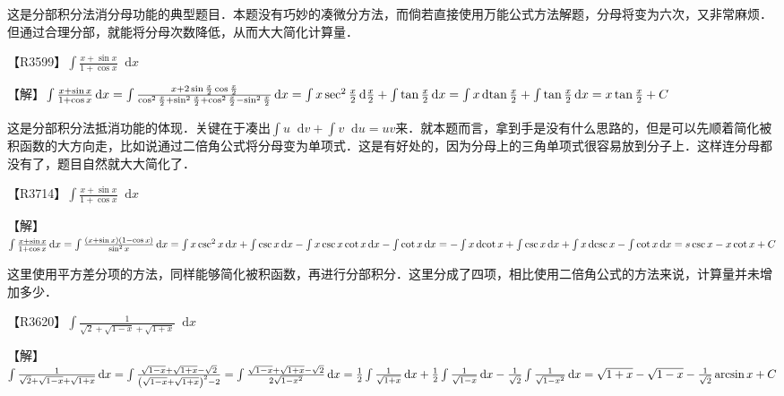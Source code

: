 \documentclass{ctexbook}
\newcommand*{\dif}{\mathop{}\!\mathrm{d}}
\begin{document}
{\kaishu 这是分部积分法消分母功能的典型题目．本题没有巧妙的凑微分方法，而倘若直接使用万能公式方法解题，分母将变为六次，又非常麻烦．但通过合理分部，就能将分母次数降低，从而大大简化计算量．}\par
【R3599】$\int\frac{x+\sin{x}}{1+\cos{x}}\dif{x}$\par
【解】$\int\frac{x+\sin{x}}{1+\cos{x}}\dif{x}\\=\int\frac{x+2\sin{\frac{x}{2}}\cos{\frac{x}{2}}}{\cos^{2}{\frac{x}{2}}+\sin^{2}{\frac{x}{2}}+\cos^{2}{\frac{x}{2}}-\sin^{2}{\frac{x}{2}}}\dif{x}\\=\int x\sec^{2}{\frac{x}{2}}\dif{\frac{x}{2}}+\int\tan{\frac{x}{2}}\dif{x}\\=\int x\dif{\tan{\frac{x}{2}}}+\int\tan{\frac{x}{2}}\dif{x}\\=x\tan{\frac{x}{2}}+C$\par
{\kaishu 这是分部积分法抵消功能的体现．关键在于凑出$\int u\dif{v}+\int v\dif{u}=uv$来．就本题而言，拿到手是没有什么思路的，但是可以先顺着简化被积函数的大方向走，比如说通过二倍角公式将分母变为单项式．这是有好处的，因为分母上的三角单项式很容易放到分子上．这样连分母都没有了，题目自然就大大简化了．}\par
【R3714】$\int\frac{x+\sin{x}}{1+\cos{x}}\dif{x}$\par
【解】$\int\frac{x+\sin{x}}{1+\cos{x}}\dif{x}\\=\int\frac{\left(x+\sin{x}\right)\left(1-\cos{x}\right)}{\sin^{2}{x}}\dif{x}\\=\int x\csc^{2}{x}\dif{x}+\int\csc{x}\dif{x}-\int x\csc{x}\cot{x}\dif{x}-\int\cot{x}\dif{x}\\=-\int x\dif{\cot{x}}+\int\csc{x}\dif{x}+\int x\dif{\csc{x}}-\int\cot{x}\dif{x}\\=s\csc{x}-x\cot{x}+C$\par
{\kaishu 这里使用平方差分项的方法，同样能够简化被积函数，再进行分部积分．这里分成了四项，相比使用二倍角公式的方法来说，计算量并未增加多少．}\par
【R3620】$\int\frac{1}{\sqrt{2}+\sqrt{1-x}+\sqrt{1+x}}\dif{x}$\par
【解】$\int\frac{1}{\sqrt{2}+\sqrt{1-x}+\sqrt{1+x}}\dif{x}\\=\int\frac{\sqrt{1-x}+\sqrt{1+x}-\sqrt{2}}{\left(\sqrt{1-x}+\sqrt{1+x}\right)^{2}-2}\\=\int\frac{\sqrt{1-x}+\sqrt{1+x}-\sqrt{2}}{2\sqrt{1-x^{2}}}\dif{x}\\=\frac{1}{2}\int\frac{1}{\sqrt{1+x}}\dif{x}+\frac{1}{2}\int\frac{1}{\sqrt{1-x}}\dif{x}-\frac{1}{\sqrt{2}}\int\frac{1}{\sqrt{1-x^{2}}}\dif{x}\\=\sqrt{1+x}-\sqrt{1-x}-\frac{1}{\sqrt{2}}\arcsin{x}+C$\par
\end{document}

